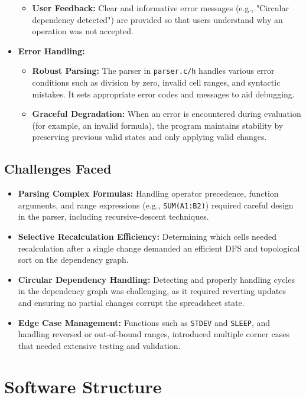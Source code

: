 \documentclass[11pt,a4paper]{article}
\begin{document}
\begin{itemize}[noitemsep]
\begin{itemize}[noitemsep]
        \item \textbf{User Feedback:} Clear and informative error messages (e.g., "Circular dependency detected") are provided so that users understand why an operation was not accepted.
    \end{itemize}
    \item \textbf{Error Handling:} 
    \begin{itemize}[noitemsep]
        \item \textbf{Robust Parsing:} The parser in \texttt{parser.c/h} handles various error conditions such as division by zero, invalid cell ranges, and syntactic mistakes. It sets appropriate error codes and messages to aid debugging.
        \item \textbf{Graceful Degradation:} When an error is encountered during evaluation (for example, an invalid formula), the program maintains stability by preserving previous valid states and only applying valid changes.
    \end{itemize}
\end{itemize}

\subsection{Challenges Faced}
\begin{itemize}[noitemsep]
    \item \textbf{Parsing Complex Formulas:} Handling operator precedence, function arguments, and range expressions (e.g., \texttt{SUM(A1:B2)}) required careful design in the parser, including recursive-descent techniques.
    \item \textbf{Selective Recalculation Efficiency:} Determining which cells needed recalculation after a single change demanded an efficient DFS and topological sort on the dependency graph.
    \item \textbf{Circular Dependency Handling:} Detecting and properly handling cycles in the dependency graph was challenging, as it required reverting updates and ensuring no partial changes corrupt the spreadsheet state.
    \item \textbf{Edge Case Management:} Functions such as \texttt{STDEV} and \texttt{SLEEP}, and handling reversed or out-of-bound ranges, introduced multiple corner cases that needed extensive testing and validation.
\end{itemize}

\section{Software Structure}
\end{document}
